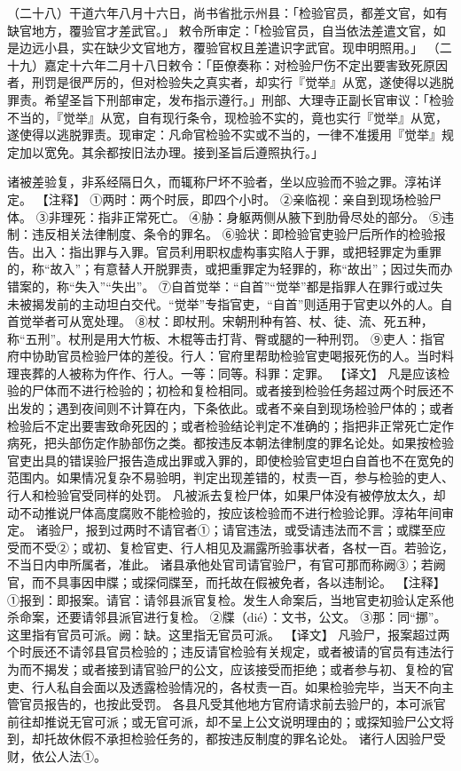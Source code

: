 \documentclass[12pt,UTF8]{ctexbook}
\begin{document}
（二十八）干道六年八月十六日，尚书省批示州县：「检验官员，都差文官，如有缺官地方，覆验官才差武官。」
敕令所审定：「检验官员，自当依法差遣文官，如是边远小县，实在缺少文官地方，覆验官权且差遣识字武官。现申明照用。」
（二十九）嘉定十六年二月十八日敕令：「臣僚奏称：对检验尸伤不定出要害致死原因者，刑罚是很严厉的，但对检验失之真实者，却实行『觉举』从宽，遂使得以逃脱罪责。希望圣旨下刑部审定，发布指示遵行。」刑部、大理寺正副长官审议：「检验不当的，『觉举』从宽，自有现行条令，现检验不实的，竟也实行『觉举』从宽，遂使得以逃脱罪责。现审定：凡命官检验不实或不当的，一律不准援用『觉举』规定加以宽免。其余都按旧法办理。接到圣旨后遵照执行。」


诸被差验复，非系经隔日久，而辄称尸坏不验者，坐以应验而不验之罪。淳祐详定。
【注释】
①两时：两个时辰，即四个小时。
②亲临视：亲自到现场检验尸体。
③非理死：指非正常死亡。
④胁：身躯两侧从腋下到肋骨尽处的部分。
⑤违制：违反相关法律制度、条令的罪名。
⑥验状：即检验官吏验尸后所作的检验报告。出入：指出罪与入罪。官员利用职权虚构事实陷人于罪，或把轻罪定为重罪的，称“故入”；有意替人开脱罪责，或把重罪定为轻罪的，称“故出”；因过失而办错案的，称“失入”“失出”。
⑦自首觉举：“自首”“觉举”都是指罪人在罪行或过失未被揭发前的主动坦白交代。“觉举”专指官吏，“自首”则适用于官吏以外的人。自首觉举者可从宽处理。
⑧杖：即杖刑。宋朝刑种有笞、杖、徒、流、死五种，称“五刑”。杖刑是用大竹板、木棍等击打背、臀或腿的一种刑罚。
⑨吏人：指官府中协助官员检验尸体的差役。行人：官府里帮助检验官吏喝报死伤的人。当时料理丧葬的人被称为仵作、行人。一等：同等。科罪：定罪。
【译文】
凡是应该检验的尸体而不进行检验的；初检和复检相同。或者接到检验任务超过两个时辰还不出发的；遇到夜间则不计算在内，下条依此。或者不亲自到现场检验尸体的；或者检验后不定出要害致命死因的；或者检验结论判定不准确的；指把非正常死亡定作病死，把头部伤定作胁部伤之类。都按违反本朝法律制度的罪名论处。如果按检验官吏出具的错误验尸报告造成出罪或入罪的，即使检验官吏坦白自首也不在宽免的范围内。如果情况复杂不易验明，判定出现差错的，杖责一百，参与检验的吏人、行人和检验官受同样的处罚。
凡被派去复检尸体，如果尸体没有被停放太久，却动不动推说尸体高度腐败不能检验的，按应该检验而不进行检验论罪。淳祐年间审定。
诸验尸，报到过两时不请官者①；请官违法，或受请违法而不言；或牒至应受而不受②；或初、复检官吏、行人相见及漏露所验事状者，各杖一百。若验讫，不当日内申所属者，准此。
诸县承他处官司请官验尸，有官可那而称阙③；若阙官，而不具事因申牒；或探伺牒至，而托故在假被免者，各以违制论。
【注释】
①报到：即报案。请官：请邻县派官复检。发生人命案后，当地官吏初验认定系他杀命案，还要请邻县派官进行复检。
②牒（dié）：文书，公文。
③那：同“挪”。这里指有官员可派。阙：缺。这里指无官员可派。
【译文】
凡验尸，报案超过两个时辰还不请邻县官员检验的；违反请官检验有关规定，或者被请的官员有违法行为而不揭发；或者接到请官验尸的公文，应该接受而拒绝；或者参与初、复检的官吏、行人私自会面以及透露检验情况的，各杖责一百。如果检验完毕，当天不向主管官员报告的，也按此受罚。
各县凡受其他地方官府请求前去验尸的，本可派官前往却推说无官可派；或无官可派，却不呈上公文说明理由的；或探知验尸公文将到，却托故休假不承担检验任务的，都按违反制度的罪名论处。
诸行人因验尸受财，依公人法①。
\end{document}
